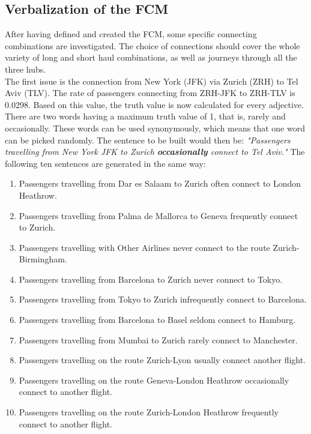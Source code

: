 \documentclass[conference]{IEEEtran}
\begin{document}
\subsection{Verbalization of the FCM}
After having defined and created the FCM, some specific connecting combinations are investigated. The choice of connections should cover the whole variety of long and short haul combinations, as well as journeys through all the three hubs.\\
The first issue is the connection from New York (JFK) via Zurich (ZRH) to Tel Aviv (TLV). The rate of passengers connecting from ZRH-JFK to ZRH-TLV is 0.0298. Based on this value, the truth value is now calculated for every adjective. There are two words having a maximum truth value of 1, that is, rarely and occasionally. These words can be used synonymously, which means that one word can be picked randomly. The sentence to be built would then be: \newline \emph{"Passengers travelling from New York JFK to Zurich \textbf{occasionally} connect to Tel Aviv."} \newline The following ten sentences are generated in the same way:
\begin{enumerate}
\item Passengers travelling from Dar es Salaam to Zurich often connect to London Heathrow.
\item Passengers travelling from Palma de Mallorca to Geneva frequently connect to Zurich.
\item Passengers travelling with Other Airlines never connect to the route Zurich-Birmingham.
\item Passengers travelling from Barcelona to Zurich never connect to Tokyo.
\item Passengers travelling from Tokyo to Zurich infrequently connect to Barcelona.
\item Passengers travelling from Barcelona to Basel seldom connect to Hamburg.
\item Passengers travelling from Mumbai to Zurich rarely connect to Manchester.
\item Passengers travelling on the route Zurich-Lyon usually connect another flight.
\item Passengers travelling on the route Geneva-London Heathrow occasionally connect to another flight.
\item Passengers travelling on the route Zurich-London Heathrow frequently connect to another flight.
\end{enumerate}
\end{document}

